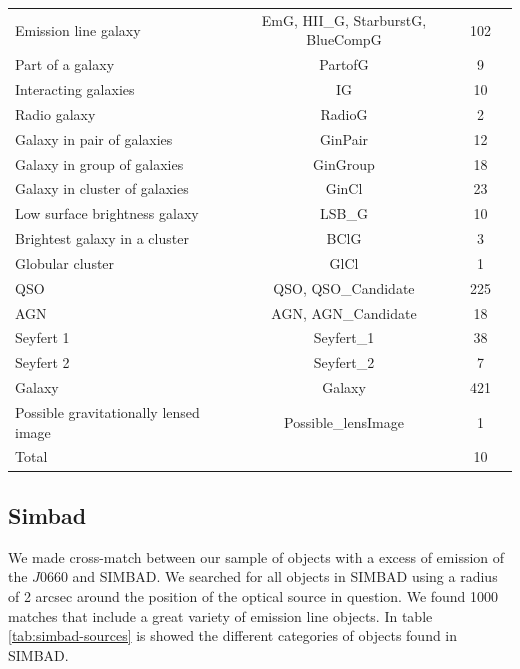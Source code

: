 \documentclass[fleqn,usenatbib]{mnras}
\begin{document}
\begin{table}
\begin{tabular}{lccc}
Emission line galaxy        & EmG, HII\_G, StarburstG, BlueCompG & 102   \\
Part of a galaxy            & PartofG                & 9                 \\
Interacting galaxies        & IG                     & 10                \\
Radio galaxy                & RadioG                 & 2                 \\
Galaxy in pair of galaxies      & GinPair            & 12                \\
Galaxy in group of galaxies     & GinGroup           & 18                \\
Galaxy in cluster of galaxies   & GinCl              & 23                \\
Low surface brightness galaxy   & LSB\_G             & 10                \\
Brightest galaxy in a cluster   & BClG               & 3                 \\
Globular cluster            & GlCl                   & 1                 \\
QSO                         & QSO, QSO\_Candidate    & 225               \\
AGN                         & AGN, AGN\_Candidate    & 18                \\
Seyfert 1                   & Seyfert\_1             & 38                \\
Seyfert 2                   & Seyfert\_2             & 7                 \\
Galaxy                      &  Galaxy                & 421               \\
Possible gravitationally lensed image & Possible\_lensImage & 1          \\
\hline
Total                       &                               & 10         \\
\hline
\end{tabular}
\end{table}

\subsection{Simbad}

We made cross-match between our sample of objects with a excess of emission of
the $J$0660 and SIMBAD. We searched for all objects in SIMBAD using a radius of 2 arcsec
around the position of the optical source in question. We found 1000
matches that include a great variety of emission line objects. In table
\ref{tab:simbad-sources} is showed the different categories of objects found
in SIMBAD.
\end{document}

